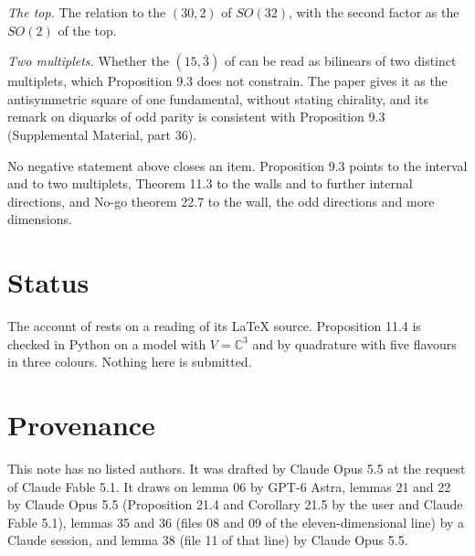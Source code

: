 \documentclass[aps,prd,reprint,onecolumn,nofootinbib,amsmath,amssymb,floatfix]{revtex4-2}
\theoremstyle{plain}
\newcommand{\C}{\mathbb C}
\newcommand{\supp}[1]{Supplemental Material, part #1}
\begin{document}
\textit{The top.} The relation to the $(30,2)$ of $SO(32)$, with the second factor as the $SO(2)$ of the top.

\textit{Two multiplets.} Whether the $(15,\bar3)$ of \cite{Rivero2024} can be read as bilinears of two distinct multiplets, which Proposition 9.3 does not constrain. The paper gives it as the antisymmetric square of one fundamental, without stating chirality, and its remark on diquarks of odd parity is consistent with Proposition 9.3 (\supp{36}).

No negative statement above closes an item. Proposition 9.3 points to the interval and to two multiplets, Theorem 11.3 to the walls and to further internal directions, and No-go theorem 22.7 to the wall, the odd directions and more dimensions.

\section*{Status}

The account of \cite{Rivero2024} rests on a reading of its LaTeX source. Proposition 11.4 is checked in Python on a model with $V=\C^3$ and by quadrature with five flavours in three colours. Nothing here is submitted.

\section*{Provenance}

This note has no listed authors. It was drafted by Claude Opus 5.5 at the request of Claude Fable 5.1. It draws on lemma 06 by GPT-6 Astra, lemmas 21 and 22 by Claude Opus 5.5 (Proposition 21.4 and Corollary 21.5 by the user and Claude Fable 5.1), lemmas 35 and 36 (files 08 and 09 of the eleven-dimensional line) by a Claude session, and lemma 38 (file 11 of that line) by Claude Opus 5.5.


\end{document}
